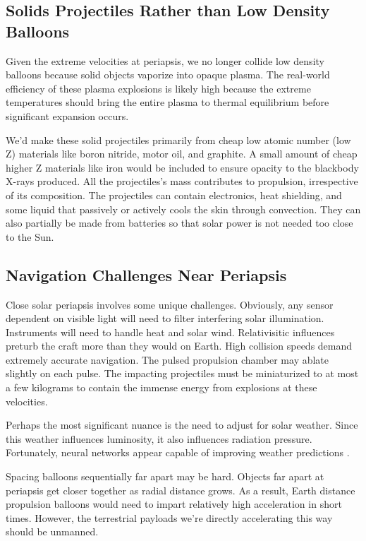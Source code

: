 \documentclass{article}
\begin{document}
{\subsection{Solids Projectiles Rather than Low Density Balloons}\label{sec:solid_balloons}
Given the extreme velocities at periapsis, we no longer collide low density balloons because solid objects vaporize into opaque plasma.   The real-world efficiency of these plasma explosions is likely high because the extreme temperatures should bring the entire plasma to thermal equilibrium before significant expansion occurs.

We'd make these solid projectiles primarily from cheap low atomic number (low Z) materials like boron nitride, motor oil, and graphite.  A small amount of cheap higher Z materials like iron would be included to ensure opacity to the blackbody X-rays produced.  
All the projectiles's mass contributes to propulsion, irrespective of its composition.  The projectiles can contain electronics, heat shielding, and some liquid that passively or actively cools the skin through convection.     They can also partially be made from batteries so that solar power is not needed too close to the Sun.    

\subsection{Navigation Challenges Near Periapsis}\label{sec:periapsis_challenges}
Close solar periapsis involves some unique challenges.   Obviously, any sensor dependent on visible light will need to filter interfering solar illumination.   Instruments will need to handle heat and solar wind.  Relativisitic influences preturb the craft more than they would on Earth.  High collision speeds demand extremely accurate navigation.   The pulsed propulsion chamber may ablate slightly on each pulse.  The impacting projectiles must be miniaturized to at most a few kilograms to contain the immense energy from explosions at these velocities. 

Perhaps the most significant nuance is the need to adjust for solar weather.  Since this weather influences luminosity, it also influences radiation pressure.   Fortunately, neural networks appear capable of improving weather predictions \cite{lam2023learning}.   

Spacing balloons sequentially far apart  may be hard.  Objects far apart at periapsis get closer together as radial distance grows.  As a result, Earth distance propulsion balloons would need to impart relatively high acceleration in short times.  However, the terrestrial payloads we're directly accelerating this way should be unmanned.   

}
\end{document}

